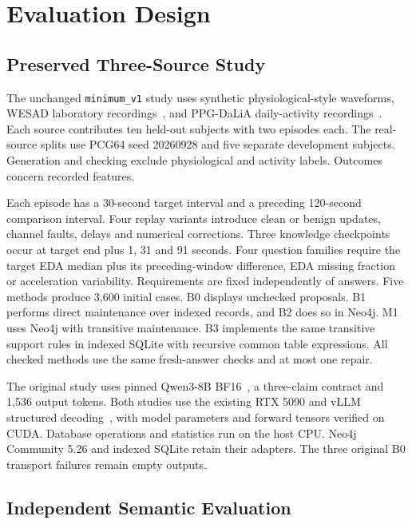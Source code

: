 \section{Evaluation Design}
\label{sec:design}

\subsection{Preserved Three-Source Study}

The unchanged \texttt{minimum\_v1} study uses synthetic physiological-style
waveforms, WESAD laboratory recordings~\cite{schmidt2018,wesad}, and PPG-DaLiA
daily-activity recordings~\cite{reiss2019,ppgdalia}. Each source contributes ten
held-out subjects with two episodes each. The real-source splits use PCG64 seed
20260928 and five separate development subjects. Generation and checking exclude physiological and activity labels.
Outcomes concern recorded features.

Each episode has a 30-second target interval and a preceding 120-second
comparison interval. Four replay variants introduce clean or benign updates,
channel faults, delays and numerical corrections. Three knowledge checkpoints
occur at target end plus 1, 31 and 91 seconds. Four question families require
the target EDA median plus its preceding-window difference, EDA missing fraction
or acceleration variability. Requirements are fixed independently of answers.
Five methods produce 3,600 initial cases. B0 displays unchecked proposals.
B1 performs direct maintenance over indexed records, and B2 does so in Neo4j.
M1 uses Neo4j with transitive maintenance. B3 implements the same transitive
support rules in indexed SQLite with recursive common table expressions.
All checked methods use the same fresh-answer checks and at most one repair.

The original study uses pinned Qwen3-8B BF16~\cite{qwen3}, a three-claim contract and
1,536 output tokens. Both studies use the existing RTX 5090 and vLLM structured
decoding~\cite{vllm}, with model parameters and forward tensors verified on CUDA.
Database operations and statistics run on the host CPU. Neo4j Community 5.26
and indexed SQLite retain their adapters. The three original B0 transport
failures remain empty outputs.

\subsection{Independent Semantic Evaluation}


